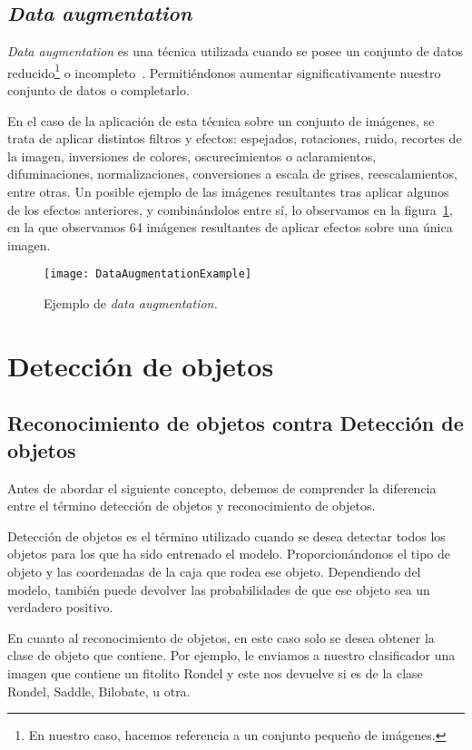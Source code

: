 \subsection{\textit{Data augmentation}}

\textit{Data augmentation} es una técnica utilizada cuando se posee un conjunto de datos reducido\footnote{En nuestro caso, hacemos referencia a un conjunto pequeño de imágenes.} o incompleto~\cite{emalgorithm}. Permitiéndonos aumentar significativamente nuestro conjunto de datos o completarlo. 

En el caso de la aplicación de esta técnica sobre un conjunto de imágenes, se trata de aplicar distintos filtros y efectos: espejados, rotaciones, ruido, recortes de la imagen, inversiones de colores, oscurecimientos o aclaramientos, difuminaciones, normalizaciones, conversiones a escala de grises, reescalamientos, entre otras. Un posible ejemplo de las imágenes resultantes tras aplicar algunos de los efectos anteriores, y combinándolos entre sí, lo observamos en la figura~\ref{fig:3.4.1}, en la que observamos 64 imágenes resultantes de aplicar efectos sobre una única imagen.

\begin{figure}
\centering
\texttt{[image: DataAugmentationExample]}
\caption{Ejemplo de \textit{data augmentation.}}
\label{fig:3.4.1}
\end{figure}

\section{Detección de objetos}

\subsection{Reconocimiento de objetos contra Detección de objetos}

Antes de abordar el siguiente concepto, debemos de comprender la diferencia entre el término detección de objetos y reconocimiento de objetos.

Detección de objetos es el término utilizado cuando se desea detectar todos los objetos para los que ha sido entrenado el modelo. Proporcionándonos el tipo de objeto y las coordenadas de la caja que rodea ese objeto. Dependiendo del modelo, también puede devolver las probabilidades de que ese objeto sea un verdadero positivo.

En cuanto al reconocimiento de objetos, en este caso solo se desea obtener la clase de objeto que contiene. Por ejemplo, le enviamos a nuestro clasificador una imagen que contiene un fitolito Rondel y este nos devuelve si es de la clase Rondel, Saddle, Bilobate, u otra.

